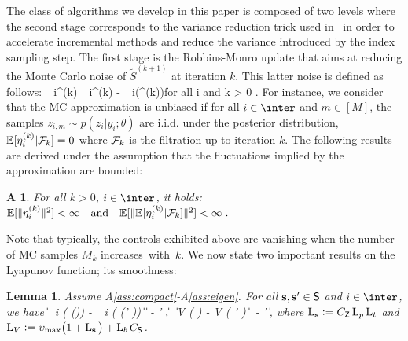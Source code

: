 \documentclass[journal, 11pt]{IEEEtran}
\newtheorem{protolemma}{Lemma}
\newenvironment{lemmacoloured}
   {\begin{shaded}\begin{protolemma}}
   {\end{protolemma}\end{shaded}}
\newtheorem{assumption}{A\!\!}
\begin{document}
The class of algorithms we develop in this paper is composed of two levels where the second stage corresponds to the variance reduction trick used in~\cite{karimi2019global} in order to accelerate incremental methods and reduce the variance introduced by the index sampling step. 
The first stage is the Robbins-Monro update that aims at reducing the Monte Carlo noise of $\tilde{S}^{(k+1)}$ at iteration $k$. This latter noise is defined as follows:
\beq\label{eq:mcerror}
\eta_{i}^{(k)} \eqdef {}_{i}^{(k)} -  \overline{\bss}_i(\vartheta^{(k)})\quad  \textrm{for all} \quad  i \in \inter \quad \textrm{and} \quad  k > 0 \eqs.
\eeq
For instance, we consider that the MC approximation is unbiased if for all $ i \in \inter$ and $m \in [M]$, the samples $z_{i,m} \sim p(z_i|y_i;\theta)$ are i.i.d. under the posterior distribution, \ie $\EE[\eta_{i}^{(k)}|{\cal F}_k] = 0$ where  ${\cal F}_k$ is the filtration up to iteration $k$.
The following results are derived under the assumption that the fluctuations implied by the approximation are bounded:
\begin{assumption}\label{ass:mcerror}
For all $k >0$, $i \in \inter$, it holds: 
$\EE [\| \eta_{i}^{(k)}\|^2 ] < \infty \quad \textrm{and} \quad \EE[\| \EE[\eta_{i}^{(k)}|{\cal F}_k]\|^2] < \infty \eqs.$
\end{assumption}
Note that typically, the controls exhibited above are vanishing when the number of MC samples $M_k$ increases~with~$k$.
We now state two important results on the Lyapunov function; its smoothness:
\begin{lemmacoloured} \label{lem:smooth}
\cite{karimi2019global} Assume A\ref{ass:compact}-A\ref{ass:eigen}.  
For all ${\mathbf{s}},{\mathbf{s}}' \in \mathsf{S}$ and $i \in \inter$, we have
\beq \label{eq:smooth}
\| \overline{\bss}_i ( \overline{\param} ({\bss})) - \overline{\bss}_i ( \overline{\param} ({\bss}' )) \| \leq \Lip{{\bss}} \| {\bss} - {\bss}' \|,~~\| \grd  V ( {\bss} ) - \grd  V ( {\bss}' ) \| \leq {} \| {\bss} - {\bss}' \|\eqs,
\eeq
where $\operatorname{L}_{{\mathbf{s}}} \mathrel{\mathop:}= C_{\mathsf{Z}} \operatorname{L}_{p} \operatorname{L}_{t}$ and $\operatorname{L}_{V}  \mathrel{\mathop:}= \upsilon_{\max} \big( 1 + \operatorname{L}_{{{\mathbf{s}}}} \big) + \operatorname{L}_{b} C_{\mathsf{S}}$.
\end{lemmacoloured}
\end{document}
